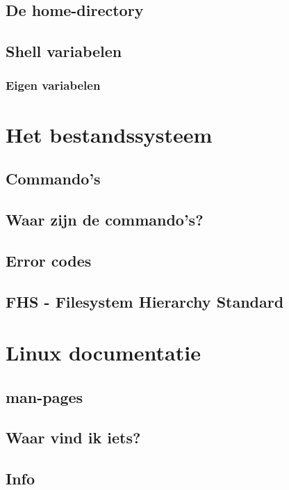 \documentclass[a4paper,12pt,twoside,openright,titlepage]{book}
\begin{document}
\section{De home-directory}

\section{Shell variabelen}

\subsection{Eigen variabelen}


\chapter{Het bestandssysteem}
\section{Commando's}

\section{Waar zijn de commando's?}

\section{Error codes}

\section{FHS - Filesystem Hierarchy Standard}


\chapter{Linux documentatie}

\section{man-pages}

\section{Waar vind ik iets?}

\section{Info}

\end{document}
